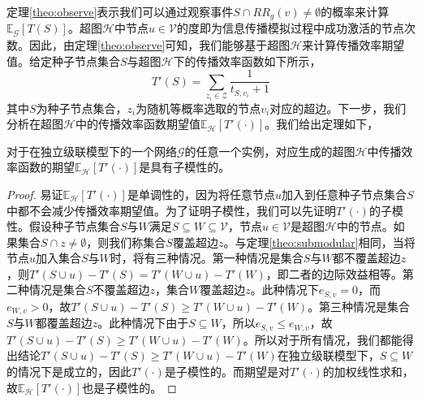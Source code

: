 定理\ref{theo:observe}表示我们可以通过观察事件$S\cap {RR}_g\left(v\right)\neq\emptyset$的概率来计算$\mathbb{E}_\mathcal{G}\left[T\left(S\right)\right]$。超图$\mathcal{H}$中节点$u \in \mathcal{V}$的度即为信息传播模拟过程中成功激活的节点次数。因此，由定理\ref{theo:observe}可知，我们能够基于超图$\mathcal{H}$来计算传播效率期望值。给定种子节点集合$S$与超图$\mathcal{H}$下的传播效率函数如下所示，
\begin{equation}\label{eq:infEffHyper}
    T'\left(S\right)=\sum\limits_{z_i\in\mathcal{Z}}{\frac{1}{t_{S,v_i}+1}}
\end{equation}
其中$S$为种子节点集合，$z_i$为随机等概率选取的节点$v_i$对应的超边。下一步，我们分析在超图$\mathcal{H}$中的传播效率函数期望值$\mathbb{E}_\mathcal{H}\left[T'\left(\cdot\right)\right]$。我们给出定理如下，
\begin{mytheo}\label{theo:hyperSubmodular}
对于在独立级联模型下的一个网络$\mathcal{G}$的任意一个实例，对应生成的超图$\mathcal{H}$中传播效率函数的期望$\mathbb{E}_\mathcal{H}\left[T'\left(\cdot\right)\right]$是具有子模性的。
\end{mytheo}
\begin{proof}
易证$\mathbb{E}_\mathcal{H}\left[T'\left(\cdot\right)\right]$是单调性的，因为将任意节点$u$加入到任意种子节点集合$S$中都不会减少传播效率期望值。为了证明子模性，我们可以先证明$T'\left(\cdot\right)$的子模性。假设种子节点集合$S$与$W$满足$S \subseteq W \subseteq \mathcal{V}$，节点$u \in \mathcal{V}$是超图$\mathcal{H}$中的节点。如果集合$S \cap z \neq \emptyset$，则我们称集合$S$覆盖超边$z$。与定理\ref{theo:submodular}相同，当将节点$u$加入集合$S$与$W$时，将有三种情况。第一种情况是集合$S$与$W$都不覆盖超边$z$，则$T'\left(S \cup u\right) - T'\left(S\right) = T'\left(W \cup u\right) - T'\left(W\right)$，即二者的边际效益相等。第二种情况是集合$S$不覆盖超边$z$，集合$W$覆盖超边$z$。此种情况下$e_{S,v} = 0$，而$e_{W,v} > 0$，故$T'\left(S \cup u\right) - T'\left(S\right) \geq T'\left(W \cup u\right) - T'\left(W\right)$。第三种情况是集合$S$与$W$都覆盖超边$z$。此种情况下由于$S \subseteq W$，所以$e_{S,v} \leq e_{W,v}$，故$T'\left(S \cup u\right) - T'\left(S\right) \geq T'\left(W \cup u\right) - T'\left(W\right)$。所以对于所有情况，我们都能得出结论$T'\left(S \cup u\right) - T'\left(S\right) \geq T'\left(W \cup u\right) - T'\left(W\right)$在独立级联模型下，$S \subseteq W$的情况下是成立的，因此$T'\left(\cdot\right)$是子模性的。而期望是对$T'\left(\cdot\right)$的加权线性求和，故$\mathbb{E}_\mathcal{H}\left[T'\left(\cdot\right)\right]$也是子模性的。
\end{proof}

